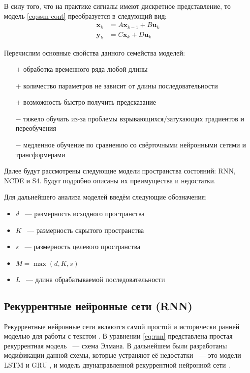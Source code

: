 \documentclass[a4paper, 12pt]{article}
\newcommand{\bx}{\mathbf{x}}
\newcommand{\by}{\mathbf{y}}
\newcommand{\bu}{\mathbf{u}}
\begin{document}
	В силу того, что на практике сигналы имеют дискретное представление, то модель \ref{eq:ssm-cont} преобразуется в следующий вид:
	\begin{equation}\label{eq:ssm-discr}
		\begin{aligned}
			\bx_k &= A\bx_{k-1} + B\bu_k \\
			\by_k &= C\bx_k + D\bu_k
		\end{aligned}
	\end{equation}

	Перечислим основные свойства данного семейства моделей:
	\begin{enumerate}
		\item[$+$] обработка временного ряда любой длины
		\item[$+$] количество параметров не зависит от длины последовательности
		\item[$+$] возможность быстро получить предсказание
		\item[$-$] тяжело обучать из-за проблемы взрывающихся/затухающих градиентов и переобучения
		\item[$-$] медленное обучение по сравнению со свёрточными нейронными сетями и трансформерами
	\end{enumerate}

	Далее будут рассмотрены следующие модели пространства состояний: RNN, NCDE и S4.
	Будут подробно описаны их преимущества и недостатки.
	
	Для дальнейшего анализа моделей введём следующие обозначения:
	\begin{itemize}
		\item $d$ ~--- размерность исходного пространства
		\item $K$ ~--- размерность скрытого пространства
		\item $s$ ~--- размерность целевого пространства
		\item $M = \max(d, K, s)$
		\item $L$ ~--- длина обрабатываемой последовательности
	\end{itemize}
	
	\subsection{Рекуррентные нейронные сети (RNN)}
	Рекуррентные нейронные сети являются самой простой и исторически ранней моделью для работы с текстом \citep{rnn}.
	В уравнении \ref{eq:rnn} представлена простая рекуррентная модель ~--- схема Элмана.
	В дальнейшем были разработаны модификации данной схемы, которые устраняют её недостатки ~--- это модели LSTM и GRU \citep{lstm, lstm-and-gru}, и модель двунаправленной рекуррентной нейронной сети \citep{bidirectional-rnn}.
	
\end{document}
